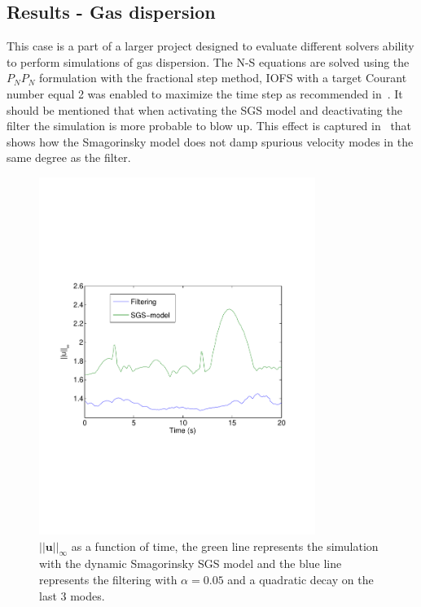 \subsection{Results - Gas dispersion} 
This case is a part of a larger project designed to evaluate different solvers 
ability to perform simulations of gas dispersion. The N-S equations are solved using
the $P_NP_N$ formulation with the fractional step method, IOFS with a target Courant number 
equal 2 was enabled to maximize the time step as recommended in~\cite{Nek}. It should be 
mentioned that when activating the SGS model and deactivating the 
filter the simulation is more probable to blow up. This effect is captured in~
that shows how the Smagorinsky model does not damp spurious velocity modes in the 
same degree as the filter. 

%
\begin{figure}[h]
	\centering
	\includegraphics[trim=0.5cm 7cm 0.5cm 7cm, width=0.8\textwidth]{Figures/maxvel.pdf}
    \caption{$||\mathbf{u}||_{\infty}$ as a function of time, the green line represents the 
simulation with the dynamic Smagorinsky SGS model and the blue line represents the filtering 
with $\alpha = 0.05$ and a quadratic decay on the last 3 modes.}
	\label{fig:maxvel}
\end{figure}
%
%
%
%
%

